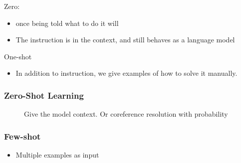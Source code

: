 \documentclass[11pt]{article}
\begin{document}
\begin{minipage}[l]{.5\linewidth}
    \begin{figure}[H]
        \centering
    \end{figure}    
\end{minipage}\hfill
\begin{minipage}[r]{.48\linewidth}
    Zero:
    \begin{itemize}
        \item once being told what to do it will
        \item The instruction is in the context, and still behaves as a language model
    \end{itemize}
    One-shot
    \begin{itemize}
        \item In addition to instruction, we give examples of how to solve it manually.
    \end{itemize}
\end{minipage}

\subsubsection{Zero-Shot Learning}

\begin{figure}[H]
    \centering
    \caption*{Give the model context. Or coreference resolution with probability}
\end{figure}    

\subsubsection{Few-shot}

\begin{minipage}[l]{.5\linewidth}
    \begin{figure}[H]
        \centering
    \end{figure}    
\end{minipage}\hfill
\begin{minipage}[r]{.48\linewidth}
    \begin{itemize}
        \item Multiple examples as input
    \end{itemize}
\end{minipage}
\end{document}

